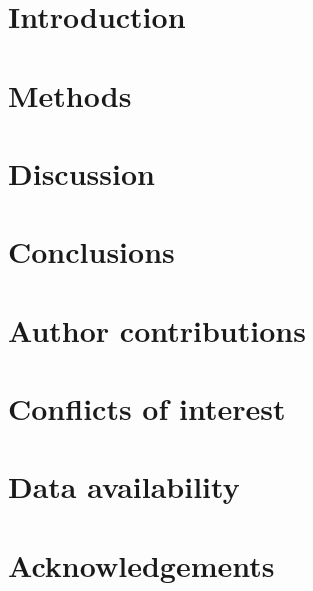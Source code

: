 
\newcommand{\nacreTitle}{Title pending}
\newcommand{\nacreAuthors}{Author list pending}
\newcommand{\nacreAbstract}{Abstract pending.}
\newcommand{\nacreTitleMark}{$^\dag$}
\newcommand{\nacreFootnotes}{%
  \footnotetext{\textit{$^{a}$~Affiliations pending.}}%
  \footnotetext{\dag~Supplementary Information available. See DOI: pending.}}




\section{Introduction}


\section{Methods}



\section{Discussion}


\section*{Conclusions}


\section*{Author contributions}


\section*{Conflicts of interest}


\section*{Data availability}


\section*{Acknowledgements}


\balance




